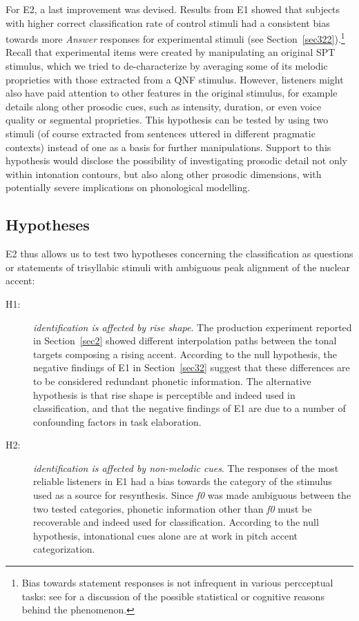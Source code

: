 For E2, a last improvement was devised. Results from E1 showed that subjects with higher correct classification rate of control stimuli had a consistent bias towards more \textit{Answer} responses for experimental stimuli (see Section~\ref{sec322}).\footnote{Bias towards statement responses is not infrequent in various percceptual tasks: see \citet{petrone2014intonation} for a discussion of the possible statistical or cognitive \citep{pandelaere2006question} reasons behind the phenomenon.} Recall that experimental items were created by manipulating an original SPT stimulus, which we tried to de-characterize by averaging some of its melodic proprieties with those extracted from a QNF stimulus. However, listeners might also have paid attention to other features in the original stimulus, for example details along other prosodic cues, such as intensity, duration, or even voice quality or segmental proprieties. This hypothesis can be tested by using two stimuli (of course extracted from sentences uttered in different pragmatic contexts) instead of one as a basis for further manipulations. Support to this hypothesis would disclose the possibility of investigating prosodic detail not only within intonation contours, but also along other prosodic dimensions, with potentially severe implications on phonological modelling.

\subsection{Hypotheses}\label{sec330}
E2 thus allows us to test two hypotheses concerning the classification as questions or statements of trisyllabic stimuli with ambiguous peak alignment of the nuclear accent:

\begin{description}
   \item[H1:] \textit{identification is affected by rise shape}. The production experiment reported in Section~\ref{sec2} showed different interpolation paths between the tonal targets composing a rising accent. According to the null hypothesis, the negative findings of E1 in Section~\ref{sec32} suggest that these differences are to be considered redundant phonetic information. The alternative hypothesis is that rise shape is perceptible and indeed used in classification, and that the negative findings of E1 are due to a number of confounding factors in task elaboration.
   \item[H2:] \textit{identification is affected by non-melodic cues}. The responses of the most reliable listeners in E1 had a bias towards the category of the stimulus used as a source for resynthesis. Since \textit{f0} was made ambiguous between the two tested categories, phonetic information other than \textit{f0} must be recoverable and indeed used for classification. According to the null hypothesis, intonational cues alone are at work in pitch accent categorization.
\end{description}

